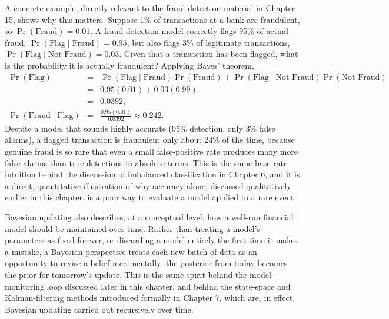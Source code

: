 \documentclass[../ai_in_finance]{subfiles}
\begin{document}
A concrete example, directly relevant to the fraud detection material in Chapter 15, shows why this matters. Suppose 1\% of transactions at a bank are fraudulent, so $\Pr(\text{Fraud}) = 0.01$. A fraud detection model correctly flags 95\% of actual fraud, $\Pr(\text{Flag}\mid\text{Fraud}) = 0.95$, but also flags 3\% of legitimate transactions, $\Pr(\text{Flag}\mid\text{Not Fraud}) = 0.03$. Given that a transaction has been flagged, what is the probability it is actually fraudulent? Applying Bayes' theorem,
\begin{eqnarray*}
\Pr(\text{Flag}) &=& \Pr(\text{Flag}\mid\text{Fraud})\Pr(\text{Fraud}) + \Pr(\text{Flag}\mid\text{Not Fraud})\Pr(\text{Not Fraud})\\
& =& 0.95(0.01) + 0.03(0.99) \\
&=& 0.0392, \\
\Pr(\text{Fraud}\mid\text{Flag}) &=& \frac{0.95(0.01)}{0.0392} \approx 0.242.
\end{eqnarray*}
Despite a model that sounds highly accurate (95\% detection, only 3\% false alarms), a flagged transaction is fraudulent only about 24\% of the time, because genuine fraud is so rare that even a small false-positive rate produces many more false alarms than true detections in absolute terms. This is the same base-rate intuition behind the discussion of imbalanced classification in Chapter 6, and it is a direct, quantitative illustration of why accuracy alone, discussed qualitatively earlier in this chapter, is a poor way to evaluate a model applied to a rare event.

Bayesian updating also describes, at a conceptual level, how a well-run financial model should be maintained over time. Rather than treating a model's parameters as fixed forever, or discarding a model entirely the first time it makes a mistake, a Bayesian perspective treats each new batch of data as an opportunity to revise a belief incrementally: the posterior from today becomes the prior for tomorrow's update. This is the same spirit behind the model-monitoring loop discussed later in this chapter, and behind the state-space and Kalman-filtering methods introduced formally in Chapter 7, which are, in effect, Bayesian updating carried out recursively over time.
\end{document}
